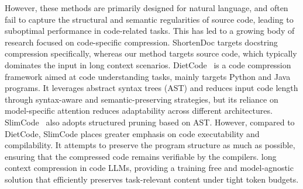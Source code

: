 However, these methods are primarily designed for natural language, and often fail to capture the structural and semantic regularities of source code, leading to suboptimal performance in code-related tasks. This has led to a growing body of research focused on code-specific compression. ShortenDoc targets docstring compression specifically, whereas
our method targets source code, which typically dominates the input in long context scenarios. DietCode~\cite{zhang2022diet} is a code compression framework aimed at code understanding tasks, mainly targets Python and Java programs. It leverages abstract syntax trees (AST) and reduces input code length through syntax-aware and semantic-preserving strategies, but its reliance on model-specific
attention reduces adaptability across different architectures. SlimCode~\cite{wang2024naturalbestmodelagnosticcode} also adopts structured pruning based on AST. However, compared to DietCode, SlimCode places greater emphasis on code executability and compilability. It attempts to preserve the program structure as much as possible, ensuring that the compressed code remains verifiable by the compilers.
long context compression in code LLMs, providing a training free and model-agnostic solution that efficiently preserves task-relevant content under tight token budgets.



